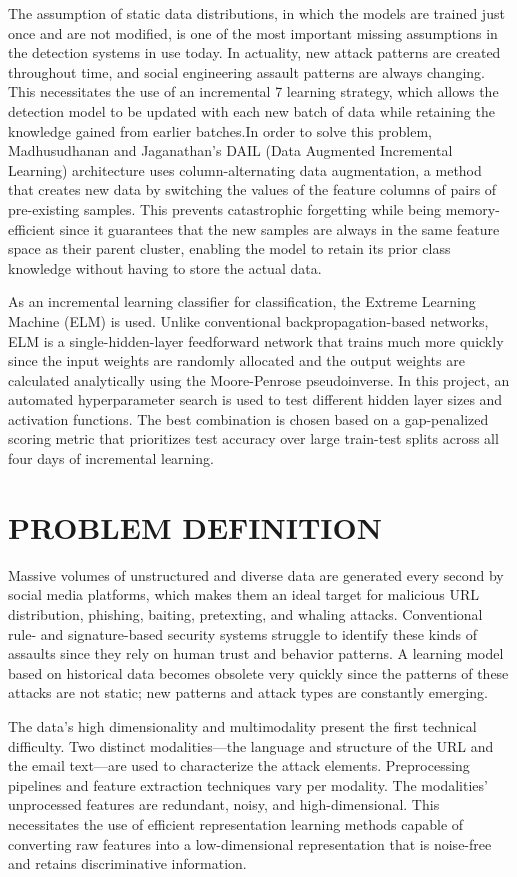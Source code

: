 The assumption of static data distributions, in which the models are trained just once and are not modified, is one of the most important missing assumptions in the detection systems in use today. In actuality, new attack patterns are created throughout time, and social engineering assault patterns are always changing. This necessitates the use of an incremental 7 learning strategy, which allows the detection model to be updated with each new batch of data while retaining the knowledge gained from earlier batches.In order to solve this problem, Madhusudhanan and Jaganathan's DAIL (Data Augmented Incremental Learning) architecture uses column-alternating data augmentation, a method that creates new data by switching the values of the feature columns of pairs of pre-existing samples. This prevents catastrophic forgetting while being memory-efficient since it guarantees that the new samples are always in the same feature space as their parent cluster, enabling the model to retain its prior class knowledge without having to store the actual data.

As an incremental learning classifier for classification, the Extreme Learning Machine (ELM) is used. Unlike conventional backpropagation-based networks, ELM is a single-hidden-layer feedforward network that trains much more quickly since the input weights are randomly allocated and the output weights are calculated analytically using the Moore-Penrose pseudoinverse. In this project, an automated hyperparameter search is used to test different hidden layer sizes and activation functions. The best combination is chosen based on a gap-penalized scoring metric that prioritizes test accuracy over large train-test splits across all four days of incremental learning.

\section{PROBLEM DEFINITION}
Massive volumes of unstructured and diverse data are generated every second by social media platforms, which makes them an ideal target for malicious URL distribution, phishing, baiting, pretexting, and whaling attacks. Conventional rule- and signature-based security systems struggle to identify these kinds of assaults since they rely on human trust and behavior patterns. A learning model based on historical data becomes obsolete very quickly since the patterns of these attacks are not static; new patterns and attack types are constantly emerging.

The data's high dimensionality and multimodality present the first technical difficulty. Two distinct modalities—the language and structure of the URL and the email text—are used to characterize the attack elements. Preprocessing pipelines and feature extraction techniques vary per modality. The modalities' unprocessed features are redundant, noisy, and high-dimensional. This necessitates the use of efficient representation learning methods capable of converting raw features into a low-dimensional representation that is noise-free and retains discriminative information.


